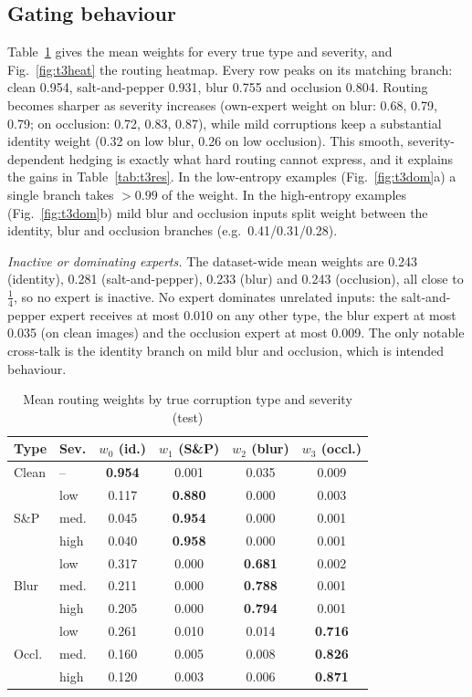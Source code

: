 \documentclass[conference]{IEEEtran}
\begin{document}
\subsection{Gating behaviour}
Table~\ref{tab:t3w} gives the mean weights for every true type and severity, and Fig.~\ref{fig:t3heat} the routing heatmap. Every row peaks on its matching branch: clean 0.954, salt-and-pepper 0.931, blur 0.755 and occlusion 0.804. Routing becomes sharper as severity increases (own-expert weight on blur: 0.68, 0.79, 0.79; on occlusion: 0.72, 0.83, 0.87), while mild corruptions keep a substantial identity weight (0.32 on low blur, 0.26 on low occlusion). This smooth, severity-dependent hedging is exactly what hard routing cannot express, and it explains the gains in Table~\ref{tab:t3res}. In the low-entropy examples (Fig.~\ref{fig:t3dom}a) a single branch takes $>0.99$ of the weight. In the high-entropy examples (Fig.~\ref{fig:t3dom}b) mild blur and occlusion inputs split weight between the identity, blur and occlusion branches (e.g.\ 0.41/0.31/0.28).

\emph{Inactive or dominating experts.} The dataset-wide mean weights are 0.243 (identity), 0.281 (salt-and-pepper), 0.233 (blur) and 0.243 (occlusion), all close to $\tfrac14$, so no expert is inactive. No expert dominates unrelated inputs: the salt-and-pepper expert receives at most 0.010 on any other type, the blur expert at most 0.035 (on clean images) and the occlusion expert at most 0.009. The only notable cross-talk is the identity branch on mild blur and occlusion, which is intended behaviour.

\begin{table}[!t]
\caption{Mean routing weights by true corruption type and severity (test)}
\label{tab:t3w}
\centering\footnotesize
\begin{tabular}{@{}llcccc@{}}
\toprule
Type & Sev. & $w_0$ (id.) & $w_1$ (S\&P) & $w_2$ (blur) & $w_3$ (occl.)\\
\midrule
Clean & -- & \textbf{0.954} & 0.001 & 0.035 & 0.009\\
\multirow{3}{*}{S\&P} & low & 0.117 & \textbf{0.880} & 0.000 & 0.003\\
 & med. & 0.045 & \textbf{0.954} & 0.000 & 0.001\\
 & high & 0.040 & \textbf{0.958} & 0.000 & 0.001\\
\multirow{3}{*}{Blur} & low & 0.317 & 0.000 & \textbf{0.681} & 0.002\\
 & med. & 0.211 & 0.000 & \textbf{0.788} & 0.001\\
 & high & 0.205 & 0.000 & \textbf{0.794} & 0.001\\
\multirow{3}{*}{Occl.} & low & 0.261 & 0.010 & 0.014 & \textbf{0.716}\\
 & med. & 0.160 & 0.005 & 0.008 & \textbf{0.826}\\
 & high & 0.120 & 0.003 & 0.006 & \textbf{0.871}\\
\bottomrule
\end{tabular}
\end{table}
\end{document}
